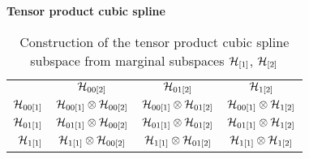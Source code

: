 \begin{example}{\textbf {Tensor product cubic spline}}
\begin{table}[H]
\centering %
\begin{tabular}{r|c|c|c|} %
\multicolumn{1}{c}{} & \multicolumn{1}{c}{	$\mathcal{H}_{00\left[2\right]}$}	&	\multicolumn{1}{c}{$\mathcal{H}_{01\left[2\right]}$}	&\multicolumn{1}{c}{ $\mathcal{H}_{1\left[2\right]}$}\\ [1.5ex] 
\cline{2-4}  %
$\mathcal{H}_{00\left[1\right]}$		& $\mathcal{H}_{00\left[1\right]}\otimes \mathcal{H}_{00\left[2\right]}$ 	&	$\mathcal{H}_{00\left[1\right]}	\otimes \mathcal{H}_{01\left[2\right]} $	&	$\mathcal{H}_{00\left[1\right]}	\otimes \mathcal{H}_{1\left[2\right]}$   \\ [1.5ex] 
$\mathcal{H}_{01\left[1\right]}$		& $\mathcal{H}_{01\left[1\right]} \otimes \mathcal{H}_{00\left[2\right]}$			& 	$\mathcal{H}_{01\left[1\right]} \otimes \mathcal{H}_{01\left[2\right]}$   &   $\mathcal{H}_{01\left[1\right]} \otimes \mathcal{H}_{1\left[2\right]}$\\ [1.5ex] 
 $\mathcal{H}_{1\left[1\right]}$	& 	 $\mathcal{H}_{1\left[1\right]} \otimes \mathcal{H}_{00\left[2\right]}$	&	$\mathcal{H}_{1\left[1\right]} \otimes \mathcal{H}_{01\left[2\right]}$ 	&	$\mathcal{H}_{1\left[1\right]} \otimes \mathcal{H}_{1\left[2\right]}$ \\ [1.5ex] 
\cline{2-4}
\end{tabular}
\caption{Construction of the tensor product cubic spline subspace from marginal subspaces $\mathcal{H}_{\left[1\right]}$, $\mathcal{H}_{\left[2\right]}$} %
\label{table:tensor-product-cubic-spline-RKHS-table}
\end{table}


\end{example}
